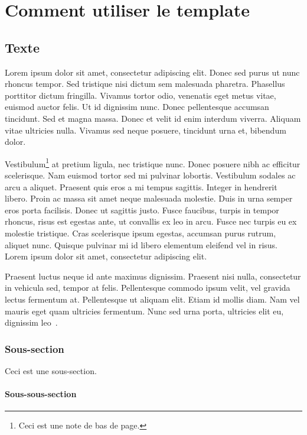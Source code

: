 \chapter{Comment utiliser le template}

\section{Texte}

Lorem ipsum dolor sit amet, consectetur adipiscing elit. Donec sed purus ut nunc rhoncus tempor. Sed tristique nisi dictum sem malesuada pharetra. Phasellus porttitor dictum fringilla. Vivamus tortor odio, venenatis eget metus vitae, euismod auctor felis. Ut id dignissim nunc. Donec pellentesque accumsan tincidunt. Sed et magna massa. Donec et velit id enim interdum viverra. Aliquam vitae ultricies nulla. Vivamus sed neque posuere, tincidunt urna et, bibendum dolor.

Vestibulum\footnote{Ceci est une note de bas de page.} at pretium ligula, nec tristique nunc. Donec posuere nibh ac efficitur scelerisque. Nam euismod tortor sed mi pulvinar lobortis. Vestibulum sodales ac arcu a aliquet. Praesent quis eros a mi tempus sagittis. Integer in hendrerit libero. Proin ac massa sit amet neque malesuada molestie. Duis in urna semper eros porta facilisis. Donec ut sagittis justo. Fusce faucibus, turpis in tempor rhoncus, risus est egestas ante, ut convallis ex leo in arcu. Fusce nec turpis eu ex molestie tristique. Cras scelerisque ipsum egestas, accumsan purus rutrum, aliquet nunc. Quisque pulvinar mi id libero elementum eleifend vel in risus. Lorem ipsum dolor sit amet, consectetur adipiscing elit.

Praesent luctus neque id ante maximus dignissim. Praesent nisi nulla, consectetur in vehicula sed, tempor at felis. Pellentesque commodo ipsum velit, vel gravida lectus fermentum at. Pellentesque ut aliquam elit. Etiam id mollis diam. Nam vel mauris eget quam ultricies fermentum. Nunc sed urna porta, ultricies elit eu, dignissim leo~\cite{ref1}.

\subsection{Sous-section}

Ceci est une sous-section.

\subsubsection{Sous-sous-section}

